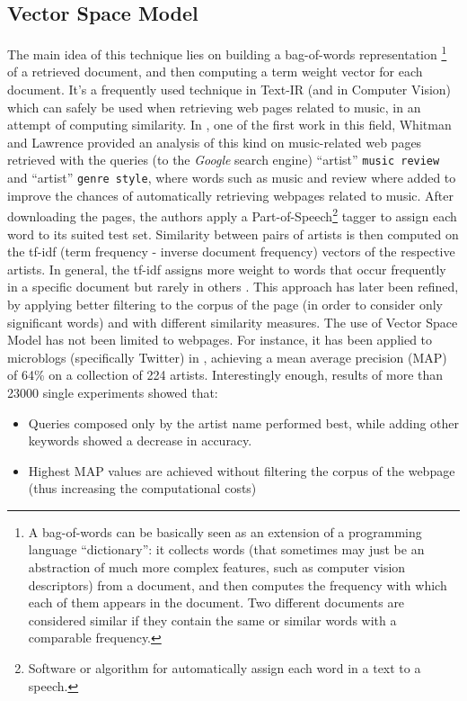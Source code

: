 \subsection{Vector Space Model} 
The main idea of this technique lies on building a bag-of-words representation \footnote{A bag-of-words can be basically seen as an extension of a programming language ``dictionary'': it collects words (that sometimes may just be an abstraction of much more complex features, such as computer vision descriptors) from a document, and then computes the frequency with which each of them appears in the document. Two different documents are considered similar if they contain the same or similar words with a comparable frequency.} of a retrieved document, and then computing a term weight vector for each document. It's a frequently used technique in Text-IR (and in Computer Vision) which can safely be used when retrieving web pages related to music, in an attempt of computing similarity. In \cite{whitman02}, one of the first work in this field, Whitman and Lawrence provided an analysis of this kind on music-related web pages retrieved with the queries (to the \textit{Google} search engine) ``artist'' \texttt{music review} and ``artist'' \texttt{genre style}, where words such as music and review where added to improve the chances of automatically retrieving webpages related to music. After downloading the pages, the authors apply a Part-of-Speech\footnote{Software or algorithm for automatically assign each word in a text to a speech.} tagger to assign each word to its suited test set. Similarity between pairs of artists is then computed on the tf-idf (term frequency - inverse document frequency) vectors of the respective artists. In general, the tf-idf assigns more weight to words that occur frequently in a specific document but rarely in others \cite{musicdatamining}. This approach has later been refined, by applying better filtering to the corpus of the page (in order to consider only significant words) and with different similarity measures. The use of Vector Space Model has not been limited to webpages. For instance, it has been applied to microblogs (specifically Twitter) in \cite{schedl12}, achieving a mean average precision (MAP) of 64\% on a collection of 224 artists. Interestingly enough, results of more than 23000 single experiments showed that:
\begin{itemize}
\item Queries composed only by the artist name performed best, while adding other keywords showed a decrease in accuracy.
\item Highest MAP values are achieved without filtering the corpus of the webpage (thus increasing the computational costs)
\end{itemize}
